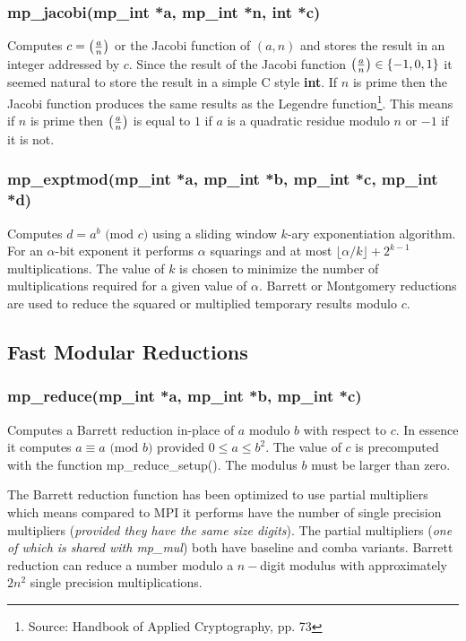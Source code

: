 \documentclass{article}
\begin{document}
\subsubsection{mp\_jacobi(mp\_int *a, mp\_int *n, int *c)}
Computes $c = \left ( {a \over n} \right )$ or the Jacobi function of $(a, n)$ and stores the result in an integer addressed
by $c$.  Since the result of the Jacobi function $\left ( {a \over n} \right ) \in \lbrace -1, 0, 1 \rbrace$ it seemed
natural to store the result in a simple C style \textbf{int}.  If $n$ is prime then the Jacobi function produces
the same results as the Legendre function\footnote{Source: Handbook of Applied Cryptography, pp. 73}.  This means if
$n$ is prime then $\left ( {a \over n} \right )$ is equal to $1$ if $a$ is a quadratic residue modulo $n$ or $-1$ if 
it is not.

\subsubsection{mp\_exptmod(mp\_int *a, mp\_int *b, mp\_int *c, mp\_int *d)}
Computes $d = a^b \mbox{ (mod }c\mbox{)}$ using a sliding window $k$-ary exponentiation algorithm.  For an $\alpha$-bit
exponent it performs $\alpha$ squarings and at most $\lfloor \alpha/k \rfloor + 2^{k-1}$ multiplications.  The value of $k$ is
chosen to minimize the number of multiplications required for a given value of $\alpha$.  Barrett or Montgomery 
reductions are used to reduce the squared or multiplied temporary results modulo $c$.

\subsection{Fast Modular Reductions}

\subsubsection{mp\_reduce(mp\_int *a, mp\_int *b, mp\_int *c)}
Computes a Barrett reduction in-place of $a$ modulo $b$ with respect to $c$.  In essence it computes 
$a \equiv a \mbox{ (mod }b\mbox{)}$ provided $0 \le a \le b^2$.  The value of $c$ is precomputed with the 
function mp\_reduce\_setup().  The modulus $b$ must be larger than zero.

The Barrett reduction function has been optimized to use partial multipliers which means compared to MPI it performs
have the number of single precision multipliers (\textit{provided they have the same size digits}).  The partial
multipliers (\textit{one of which is shared with mp\_mul}) both have baseline and comba variants.  Barrett reduction 
can reduce a number modulo a $n-$digit modulus with approximately $2n^2$ single precision multiplications.  
\end{document}
